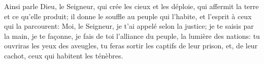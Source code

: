 Ainsi parle Dieu, le Seigneur, qui crée les cieux et les déploie,
	qui affermit la terre et ce qu’elle produit;
	il donne le souffle au peuple qui l’habite, et l’esprit à ceux qui la parcourent:
Moi, le Seigneur, je t’ai appelé selon la justice;
	je te saisis par la main, je te façonne,
	je fais de toi l’alliance du peuple, la lumière des nations:
	tu ouvriras les yeux des aveugles,
	tu feras sortir les captifs de leur prison,
	et, de leur cachot, ceux qui habitent les ténèbres.
